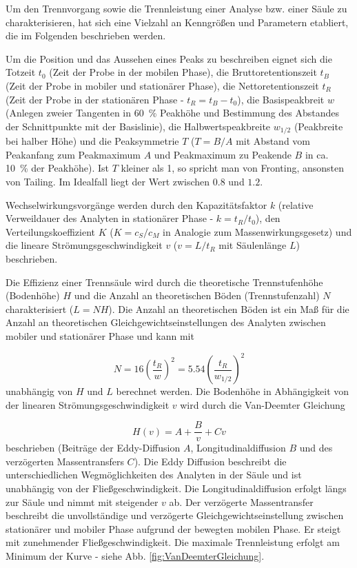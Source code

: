     Um den Trennvorgang sowie die Trennleistung einer Analyse bzw. einer Säule zu charakterisieren, hat sich eine Vielzahl an Kenngrößen und Parametern etabliert, die im Folgenden beschrieben werden.
    
     Um die Position und das Aussehen eines Peaks zu beschreiben eignet sich die Totzeit $t_0$ (Zeit der Probe in der mobilen Phase), die Bruttoretentionszeit $t_B$ (Zeit der Probe in mobiler und stationärer Phase), die Nettoretentionszeit $t_R$ (Zeit der Probe in der stationären Phase - $t_R = t_B - t_0$), die Basispeakbreit $w$ (Anlegen zweier Tangenten in \SI[mode=text]{60}{\percent} Peakhöhe und Bestimmung des Abstandes der Schnittpunkte mit der Basislinie), die Halbwertspeakbreite $w_{1/2}$ (Peakbreite bei halber Höhe) und die Peaksymmetrie $T$ ($T = B / A$ mit Abstand vom Peakanfang zum Peakmaximum $A$ und Peakmaximum zu Peakende $B$ in ca. \SI[mode=text]{10}{\percent} der Peakhöhe). Ist $T$ kleiner als 1, so spricht man von Fronting, ansonsten von Tailing. Im Idealfall liegt der Wert zwischen $0.8$ und $1.2$. 
    
    Wechselwirkungsvorgänge werden durch den Kapazitätsfaktor $k$ (relative Verweildauer des Analyten in stationärer Phase - $k = t_R / t_0$), den Verteilungskoeffizient $K$ ($K = c_S / c_M$ in Analogie zum Massenwirkungsgesetz) und die lineare Strömungsgeschwindigkeit $v$ ($v = L / t_R$ mit Säulenlänge $L$) beschrieben. 
    
    Die Effizienz einer Trennsäule wird durch die theoretische Trennstufenhöhe (Bodenhöhe) $H$ und die Anzahl an theoretischen Böden (Trennstufenzahl) $N$ charakterisiert ($L = N H$). Die Anzahl an theoretischen Böden ist ein Maß für die Anzahl an theoretischen Gleichgewichtseinstellungen des Analyten zwischen mobiler und stationärer Phase und kann mit 
    
      \begin{equation}
        N = 16 \left(\frac{t_R}{w}\right)^2 = 5.54 \left(\frac{t_R}{w_{1/2}}\right)^2
      \end{equation} 
    unabhängig von $H$ und $L$ berechnet werden. Die Bodenhöhe in Abhängigkeit von der linearen Strömungsgeschwindigkeit $v$ wird durch die Van-Deemter Gleichung 
    
      \begin{equation}
        H(v) = A + \frac{B}{v} + C v
      \end{equation}
    beschrieben (Beiträge der Eddy-Diffusion $A$, Longitudinaldiffusion $B$ und des verzögerten Massentransfers $C$). Die Eddy Diffusion beschreibt die unterschiedlichen Wegmöglichkeiten des Analyten in der Säule und ist unabhängig von der Fließgeschwindigkeit. Die Longitudinaldiffusion erfolgt längs zur Säule und nimmt mit steigender $v$ ab. Der verzögerte Massentransfer beschreibt die unvollständige und verzögerte Gleichgewichtseinstellung zwischen stationärer und mobiler Phase aufgrund der bewegten mobilen Phase. Er steigt mit zunehmender Fließgeschwindigkeit. Die maximale Trennleistung erfolgt am Minimum der Kurve - siehe Abb. \ref{fig:VanDeemterGleichung}. 
    
